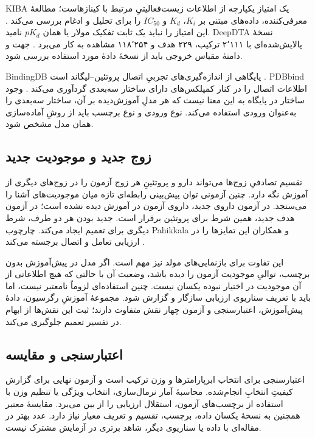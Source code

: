 KIBA یک امتیاز یکپارچه از اطلاعات زیست‌فعالیتیِ مرتبط با کینازهاست؛ مطالعهٔ معرفی‌کننده، داده‌های مبتنی بر $K_i$، $K_d$ و $IC_{50}$ را برای تحلیل و ادغام بررسی می‌کند \cite{Tang14KIBA}. این امتیاز را نباید یک ثابت تفکیک مولار یا همان $pK_d$ نامید. DeepDTA نسخهٔ پالایش‌شده‌ای با ۲٬۱۱۱ ترکیب، ۲۲۹ هدف و ۱۱۸٬۲۵۴ مشاهده به کار می‌برد \cite{Ozturk18DeepDTA}. جهت و دامنهٔ مقیاس خروجی باید از نسخهٔ دادهٔ مورد استفاده بررسی شود.

BindingDB پایگاهی از اندازه‌گیری‌های تجربیِ اتصال پروتئین--لیگاند است \cite{Liu07BindingDB}. PDBbind اطلاعات اتصال را در کنار کمپلکس‌های دارای ساختار سه‌بعدی گردآوری می‌کند \cite{Wang04PDBbind}. وجود ساختار در پایگاه به این معنا نیست که هر مدلِ آموزش‌دیده بر آن، ساختار سه‌بعدی را به‌عنوان ورودی استفاده می‌کند. نوع ورودی و نوع برچسب باید از روشِ آماده‌سازی همان مدل مشخص شود.

\subsection{زوج جدید و موجودیت جدید}
تقسیم تصادفیِ زوج‌ها می‌تواند دارو و پروتئینِ هر زوج آزمون را در زوج‌های دیگری از آموزش نگه دارد. چنین آزمونی توان پیش‌بینی رابطه‌ای تازه میان موجودیت‌های آشنا را می‌سنجد. در آزمون داروی جدید، داروی آزمون در آموزش دیده نشده است؛ در آزمون هدف جدید، همین شرط برای پروتئین برقرار است. جدید بودن هر دو طرف، شرط دیگری برای تعمیم ایجاد می‌کند. چارچوب Pahikkala و همکاران این تمایزها را در ارزیابی تعامل و اتصال برجسته می‌کند \cite{Pahikkala15RealisticDTA}.

این تفاوت برای بازنمایی‌های مولد نیز مهم است. اگر مدل در پیش‌آموزش بدون برچسب، توالیِ موجودیت آزمون را دیده باشد، وضعیت آن با حالتی که هیچ اطلاعاتی از آن موجودیت در اختیار نبوده یکسان نیست. چنین استفاده‌ای لزوماً نامعتبر نیست، اما باید با تعریف سناریوی ارزیابی سازگار و گزارش شود. مجموعهٔ آموزشِ رگرسیون، دادهٔ پیش‌آموزش، اعتبارسنجی و آزمون چهار نقش متفاوت دارند؛ ثبت این نقش‌ها از ابهام در تفسیر تعمیم جلوگیری می‌کند.

\subsection{اعتبارسنجی و مقایسه}
اعتبارسنجی برای انتخاب ابرپارامترها و وزن ترکیب است و آزمون نهایی برای گزارش کیفیتِ انتخابِ انجام‌شده. محاسبهٔ آمار نرمال‌سازی، انتخاب ویژگی یا تنظیم وزن با استفاده از برچسب‌های آزمون، استقلال ارزیابی را از بین می‌برد. مقایسهٔ معتبر همچنین به نسخهٔ یکسان داده، برچسب، تقسیم و تعریف معیار نیاز دارد. عدد بهتر در مقاله‌ای با داده یا سناریوی دیگر، شاهد برتری در آزمایش مشترک نیست.

